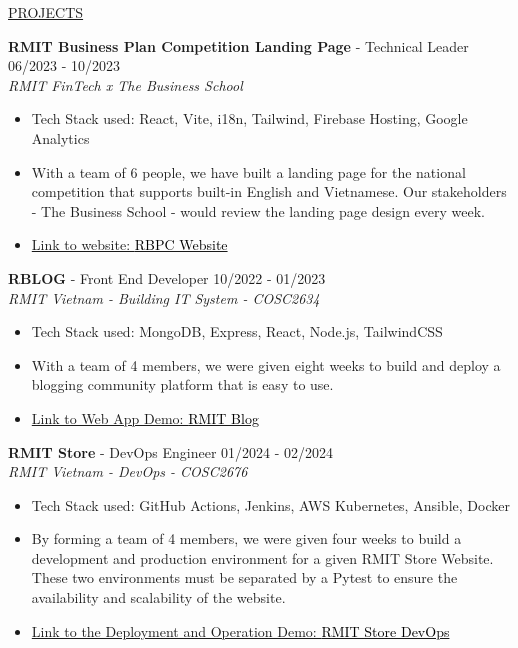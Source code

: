 \documentclass[11pt]{article}
\newcommand{\betteruline}[1]{
    \uline{#1}
}
\newcommand{\sectiontitle}[1]{
    \begingroup
        \titlebold
        \betteruline{\Large\uppercase{#1}  }
        \vspace{1.7mm}
    \endgroup
}
\newcommand{\sectioncontent}[1]{
    \begingroup
        \begin{FlushLeft}
        \vspace{-3mm}
        \sffamily\small#1
        \end{FlushLeft}
    \endgroup
    \vspace{2mm}
}
\newcommand{\job}[3]{
    \begingroup
        \textbf{\small#1} - \small#2
        \hfill\color{black!70}\small{#3}
    \endgroup
}
\newcommand{\spacevv}{
    \vspace{2mm}
}
\begin{document}
\begin{paracol}{2}
    \sectiontitle{Projects}
    \sectioncontent{
        \vspace{1mm}
    \job{RMIT Business Plan Competition Landing Page}{Technical Leader}{06/2023 - 10/2023} \\
      \textcolor{black!70}{\textit{RMIT FinTech x The Business School}}
\vspace{1mm}
      \begin{itemize}
        \item Tech Stack used: React, Vite, i18n, Tailwind, Firebase Hosting, Google Analytics
\vspace{1mm}
        \item With a team of 6 people, we have built a landing page for the national competition that supports built-in English and Vietnamese. Our stakeholders - The Business School - would review the landing page design every week.
\vspace{1mm}        
        \item  \href{https://rbpc-website.web.app/}{Link to website: \textcolor{black}{RBPC Website}}
      \end{itemize}
      \spacevv
\vspace{2mm}
    \job{RBLOG}{Front End Developer}{10/2022 - 01/2023} \\
      \textcolor{black!70}{\textit{RMIT Vietnam - Building IT System - COSC2634}}
\vspace{1mm}
      \begin{itemize}
        \item Tech Stack used: MongoDB, Express, React, Node.js, TailwindCSS
\vspace{1mm}
        \item With a team of 4 members, we were given eight weeks to build and deploy a blogging community platform that is easy to use.
\vspace{1mm}
        \item  \href{https://rmit-blog.netlify.app/}{Link to Web App Demo: \textcolor{black}{RMIT Blog}}
      \end{itemize}
      \spacevv
\vspace{2mm}
    \job{RMIT Store}{DevOps Engineer}{01/2024 - 02/2024} \\
      \textcolor{black!70}{\textit{RMIT Vietnam - DevOps - COSC2676}}
\vspace{1mm}
      \begin{itemize}
        \item Tech Stack used: GitHub Actions, Jenkins, AWS Kubernetes, Ansible, Docker
\vspace{1mm}
        \item By forming a team of 4 members, we were given four weeks to build a development and production environment for a given RMIT Store Website. These two environments must be separated by a Pytest to ensure the availability and scalability of the website.
\vspace{1mm}
        \item  \href{https://youtu.be/WmzPL43t688/}{Link to the Deployment and Operation Demo: \textcolor{black}{RMIT Store DevOps}}
      \end{itemize}
      \spacevv
    }



\end{paracol}
\end{document}

